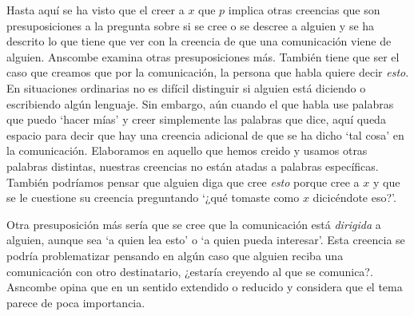 Hasta aquí se ha visto que el creer a $x$ que $p$ implica otras creencias que son presuposiciones a la pregunta sobre si se cree o se descree a alguien y se ha descrito lo que tiene que ver con la creencia de que una comunicación viene de alguien. Anscombe examina otras presuposiciones más. También tiene que ser el caso que creamos que por la comunicación, la persona que habla quiere decir \emph{esto}. En situaciones ordinarias no es difícil distinguir si alguien está diciendo o escribiendo algún lenguaje. Sin embargo, aún cuando el que habla use palabras que puedo `hacer mías' y creer simplemente las palabras que dice, aquí queda espacio para decir que hay una creencia adicional de que se ha dicho `tal cosa' en la comunicación. Elaboramos en aquello que hemos creido y usamos otras palabras distintas, nuestras creencias no están atadas a palabras específicas. También podríamos pensar que alguien diga que cree \emph{esto} porque cree a $x$ y que se le cuestione su creencia preguntando `¿qué tomaste como $x$ dicicéndote eso?'\autocite[Cf.~][8]{anscombe2008faith:tobelieve}.

Otra presuposición más sería que se cree que la comunicación está \emph{dirigida} a alguien, aunque sea `a quien lea esto' o `a quien pueda interesar'. Esta creencia se podría problematizar pensando en algún caso que alguien reciba una comunicación con otro destinatario, ¿estaría creyendo al que se comunica?. Asncombe opina que en un sentido extendido o reducido y considera que el tema parece de poca importancia\autocite[Cf.~][7]{anscombe2008faith:tobelieve}.

